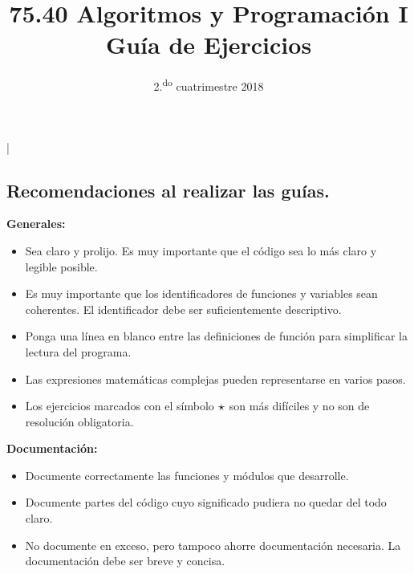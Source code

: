 \documentclass[11pt,spanish,a4paper,twoside,openany]{book}
\title{75.40 Algoritmos y Programación I \\
    \textbf{Guía de Ejercicios}}
\date{2.\textsuperscript{do} cuatrimestre 2018}
\newcommand{\dificil}{\mathlarger{\mathlarger{\star}}}
\theoremstyle{definition}
\theoremstyle{definition}
\theoremstyle{remark}
\begin{document}

\begin{extract*}
\lstMakeShortInline[style=inlinecode]|
\end{extract*}

\begin{extract} %
\maketitle
\thispagestyle{empty}

\newpage

\section*{Recomendaciones al realizar las guías.}

\textbf{Generales:}
\begin{itemize}
	\item Sea claro y prolijo. Es muy importante que el código sea lo más claro y legible posible.
	\item Es muy importante que los identificadores de funciones y variables sean coherentes. El identificador debe ser suficientemente descriptivo.
	\item Ponga una línea en blanco entre las definiciones de función para simplificar la lectura del programa.
	\item Las expresiones matemáticas complejas pueden representarse en varios pasos.
	\item Los ejercicios marcados con el símbolo $\dificil$ son más difíciles y no son de resolución obligatoria.
\end{itemize}

\textbf{Documentación:}
\begin{itemize}
	\item Documente correctamente las funciones y módulos que desarrolle.
	\item Documente partes del código cuyo significado pudiera no quedar del todo claro.
	\item No documente en exceso, pero tampoco ahorre documentación necesaria. La documentación debe ser breve y concisa.
\end{itemize}
\end{extract}
\end{document}
